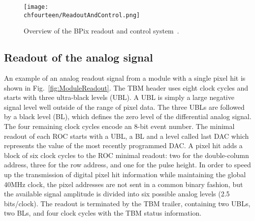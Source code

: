 \begin{figure}[!htb]
 \begin{center}
 \texttt{[image: \\chfourteen/ReadoutAndControl.png]}
 \end{center}
 \caption{Overview of the BPix readout and control system~\cite{Kotlinski200673}.}
 \label{fig:BPixSystem}
\end{figure}

\subsection{Readout of the analog signal}\label{subsec:BPixReadout}

An example of an analog readout signal from a module with a single pixel hit is shown in Fig.~\ref{fig:ModuleReadout}.
The TBM header uses eight clock cycles and starts with three ultra-black levels (UBL). A UBL is simply a large negative signal level well outside of the range of pixel data.
The three UBLs are followed by a black level (BL), which defines the zero level of the differential analog signal.
The four remaining clock cycles encode an 8-bit event number.
The minimal readout of each ROC starts with a UBL, a BL and a level called last DAC which represents the value of the most recently programmed DAC.
A pixel hit adds a block of six clock cycles to the ROC minimal readout: two for the double-column address, three for the row address, and one for the pulse height.
In order to speed up the transmission of digital pixel hit information while maintaining the global 40\unit{MHz} clock,
the pixel addresses are not sent in a common binary fashion, but the available signal amplitude is divided into six possible analog levels (2.5 bits/clock).
The readout is terminated by the TBM trailer, containing two UBLs, two BLs, and four clock cycles with the TBM status information.

